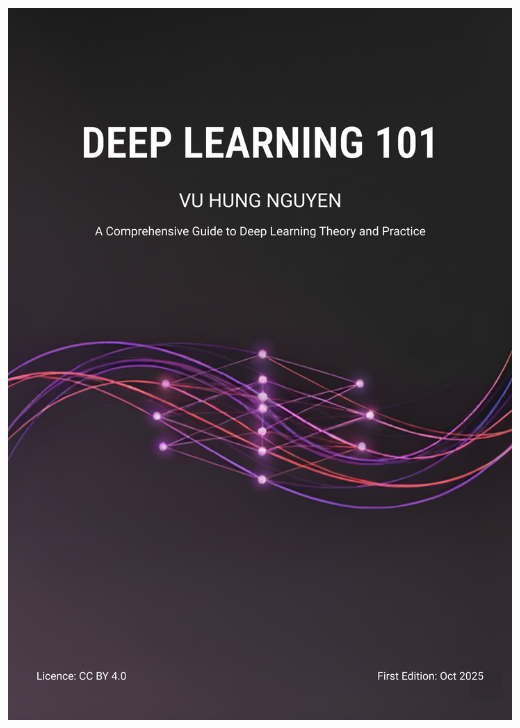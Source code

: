 \documentclass[10pt,\papersize,twoside,openright]{book}
\begin{document}
{{{{{{{              \includegraphics[width=\paperwidth,height=\paperheight]{images/DeepLearning101-cover-B5.png}%
            }{%
              }}}}}}}
\end{document}
